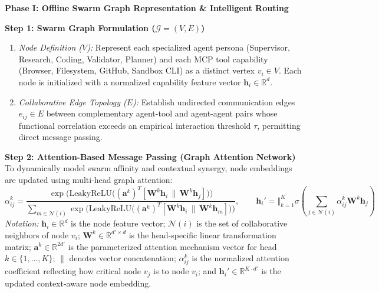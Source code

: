 \documentclass[11pt,a4paper]{article}
\begin{document}
\vspace{0.15em}
\textbf{Phase I: Offline Swarm Graph Representation \& Intelligent Routing}

\textbf{Step 1: Swarm Graph Formulation ($\mathcal{G} = (V, E)$)}
\begin{enumerate}[leftmargin=1.8em, itemsep=0.06em, topsep=0.02em]
    \item \textit{Node Definition ($V$):} Represent each specialized agent persona (Supervisor, Research, Coding, Validator, Planner) and each MCP tool capability (Browser, Filesystem, GitHub, Sandbox CLI) as a distinct vertex $v_i \in V$. Each node is initialized with a normalized capability feature vector $\mathbf{h}_i \in \mathbb{R}^d$.
    \item \textit{Collaborative Edge Topology ($E$):} Establish undirected communication edges $e_{ij} \in E$ between complementary agent-tool and agent-agent pairs whose functional correlation exceeds an empirical interaction threshold $\tau$, permitting direct message passing.
\end{enumerate}

\vspace{0.08em}
\textbf{Step 2: Attention-Based Message Passing (Graph Attention Network)}
To dynamically model swarm affinity and contextual synergy, node embeddings are updated using multi-head graph attention:
\begin{equation}
\alpha_{ij}^k = \frac{\exp\Big(\mathrm{LeakyReLU}\big((\mathbf{a}^k)^T [\mathbf{W}^k \mathbf{h}_i \,\|\, \mathbf{W}^k \mathbf{h}_j]\big)\Big)}{\sum_{m \in \mathcal{N}(i)} \exp\Big(\mathrm{LeakyReLU}\big((\mathbf{a}^k)^T [\mathbf{W}^k \mathbf{h}_i \,\|\, \mathbf{W}^k \mathbf{h}_m]\big)\Big)}, \qquad \mathbf{h}_i' = \Vert_{k=1}^K \sigma\left(\sum_{j \in \mathcal{N}(i)} \alpha_{ij}^k \mathbf{W}^k \mathbf{h}_j\right)
\end{equation}
\textit{Notation:} $\mathbf{h}_i \in \mathbb{R}^d$ is the node feature vector; $\mathcal{N}(i)$ is the set of collaborative neighbors of node $v_i$; $\mathbf{W}^k \in \mathbb{R}^{d' \times d}$ is the head-specific linear transformation matrix; $\mathbf{a}^k \in \mathbb{R}^{2d'}$ is the parameterized attention mechanism vector for head $k \in \{1,\dots,K\}$; $\|$ denotes vector concatenation; $\alpha_{ij}^k$ is the normalized attention coefficient reflecting how critical node $v_j$ is to node $v_i$; and $\mathbf{h}_i' \in \mathbb{R}^{K \cdot d'}$ is the updated context-aware node embedding.
\end{document}
